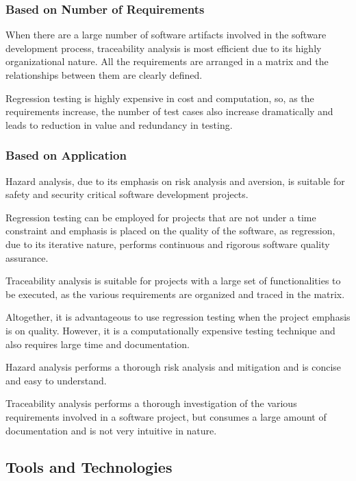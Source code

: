 \documentclass[journal, onecolumn]{IEEEtran}
\begin{document}
	\bigskip
	
	\subsubsection{Based on Number of Requirements}
	
	When there are a large number of software artifacts involved in the software development process, traceability analysis is most efficient due to its highly organizational nature. All the requirements are arranged in a matrix and the relationships between them are clearly defined. 
	
	Regression testing is highly expensive in cost and computation, so, as the requirements increase, the number of test cases also increase dramatically and leads to reduction in value and redundancy in testing.
	
	\bigskip
	
	\subsubsection{Based on Application}
	
	Hazard analysis, due to its emphasis on risk analysis and aversion, is suitable for safety and security critical software development projects.
	
	Regression testing can be employed for projects that are not under a time constraint and emphasis is placed on the quality of the software, as regression, due to its iterative nature, performs continuous and rigorous software quality assurance.
	
	Traceability analysis is suitable for projects with a large set of functionalities to be executed, as the various requirements are organized and traced in the matrix.
	
	Altogether, it is advantageous to use regression testing when the project emphasis is on quality. However, it is a computationally expensive testing technique and also requires large time and documentation.
	
	Hazard analysis performs a thorough risk analysis and mitigation and is concise and easy to understand. 
	
	Traceability analysis performs a thorough investigation of the various requirements involved in a software project, but consumes a large amount of documentation and is not very intuitive in nature.
	
	\subsection{Tools and Technologies}
	\bigskip
\end{document}
